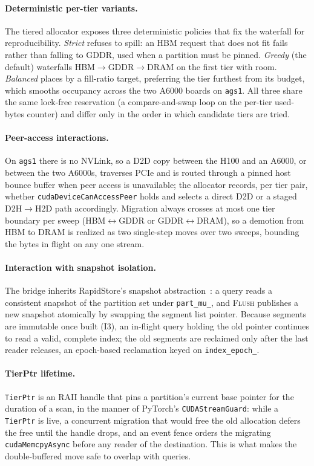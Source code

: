 \documentclass[10pt]{article}
\theoremstyle{definition}
\begin{document}
\paragraph{Deterministic per-tier variants.}
The tiered allocator exposes three deterministic policies that fix the waterfall for
reproducibility. \emph{Strict} refuses to spill: an HBM request that does not fit
fails rather than falling to GDDR, used when a partition must be pinned. \emph{Greedy}
(the default) waterfalls HBM$\to$GDDR$\to$DRAM on the first tier with room.
\emph{Balanced} places by a fill-ratio target, preferring the tier furthest from its
budget, which smooths occupancy across the two A6000 boards on \texttt{ags1}. All three
share the same lock-free reservation (a compare-and-swap loop on the per-tier used-bytes
counter) and differ only in the order in which candidate tiers are tried.

\paragraph{Peer-access interactions.}
On \texttt{ags1} there is no NVLink, so a D2D copy between the H100 and an A6000, or
between the two A6000s, traverses PCIe and is routed through a pinned host bounce
buffer when peer access is unavailable; the allocator records, per tier pair, whether
\texttt{cudaDeviceCanAccessPeer} holds and selects a direct D2D or a staged
D2H$\to$H2D path accordingly. Migration always crosses at most one tier boundary per
sweep (HBM$\leftrightarrow$GDDR or GDDR$\leftrightarrow$DRAM), so a demotion from HBM to
DRAM is realized as two single-step moves over two sweeps, bounding the bytes in flight
on any one stream.

\paragraph{Interaction with snapshot isolation.}
The bridge inherits RapidStore's snapshot abstraction~\citep{rapidstore}: a query reads
a consistent snapshot of the partition set under \texttt{part\_mu\_}, and \textsc{Flush}
publishes a new snapshot atomically by swapping the segment list pointer. Because
segments are immutable once built (I3), an in-flight query holding the old pointer
continues to read a valid, complete index; the old segments are reclaimed only after the
last reader releases, an epoch-based reclamation keyed on \texttt{index\_epoch\_}.

\paragraph{TierPtr lifetime.}
\texttt{TierPtr} is an RAII handle that pins a partition's current base pointer for the
duration of a scan, in the manner of PyTorch's \texttt{CUDAStreamGuard}: while a
\texttt{TierPtr} is live, a concurrent migration that would free the old allocation
defers the free until the handle drops, and an event fence orders the migrating
\texttt{cudaMemcpyAsync} before any reader of the destination. This is what makes the
double-buffered move safe to overlap with queries.
\end{document}
